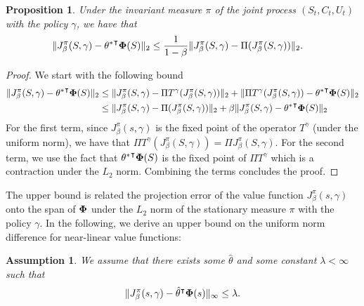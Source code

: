 \documentclass[11pt]{article}
\newtheorem{assumption}{Assumption}
\newtheorem{prop}{Proposition}
\begin{document}
\begin{prop}\label{l2_bound_prop}
Under the invariant measure $\pi$ of the joint process $(S_t,C_t,U_t)$ with the policy $\gamma$, we have that 
\begin{align*}
&\|J_\beta^\pi(S,\gamma) - {\theta^*}^\intercal {\bf \Phi}(S)\|_2 \leq\frac{1}{1-\beta}   \|J_\beta^\pi(S,\gamma) - \Pi (J_\beta^\pi(S,\gamma) ) \|_2.
\end{align*}
\end{prop}
\begin{proof}
We start with the following bound
\begin{align*}
\|J_\beta^\pi(S,\gamma) - {\theta^*}^\intercal {\bf \Phi}(S)\|_2&\leq \|J_\beta^\pi(S,\gamma) - \Pi T^\gamma(J_\beta^\pi(S,\gamma) ) \|_2 +  \|\Pi T^\gamma(J_\beta^\pi(S,\gamma) )-  {\theta^*}^\intercal {\bf \Phi}(S)\|_2\\
&\leq  \|J_\beta^\pi(S,\gamma) - \Pi (J_\beta^\pi(S,\gamma) ) \|_2 + \beta \|J_\beta^\pi(S,\gamma) - {\theta^*}^\intercal {\bf \Phi}(S)\|_2
\end{align*}
For the first term, since $J_\beta^\pi(s,\gamma)$ is the fixed point of the operator $T^\gamma$ (under the uniform norm), we have that $ \Pi T^\gamma(J_\beta^\pi(S,\gamma) ) = \Pi J_\beta^\pi(S,\gamma)$. For the second term, we use the fact that ${\theta^*}^\intercal {\bf \Phi}(S)$ is the fixed point of $\Pi T^\gamma$ which is a contraction under the $L_2$ norm. Combining the terms concludes the proof.
\end{proof}
The upper bound is related the projection error of the value function $J_\beta^\pi(s,\gamma)$ onto the span of ${\bf \Phi}$ under the $L_2$ norm of  the stationary measure $\pi$ with the policy $\gamma$. 
In the following, we derive an  upper bound on the uniform norm difference for near-linear value functions:
\begin{assumption}\label{near_lin}
We assume that there exists some $\hat{\theta}$ and some constant $\lambda<\infty$ such that 
\begin{align*}
\| J_\beta^\pi(s,\gamma) - \hat{\theta}^\intercal {\bf \Phi}(s)\|_\infty \leq \lambda. 
\end{align*}
\end{assumption}
\end{document}
